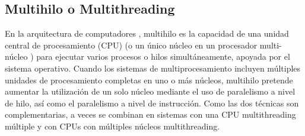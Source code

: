 \documentclass{article}
\begin{document}
\subsection{Multihilo o Multithreading}
En la arquitectura de computadores , multihilo es la capacidad de una unidad central de procesamiento (CPU) (o un único núcleo en un procesador multi-núcleo ) para ejecutar varios procesos o hilos simultáneamente, apoyada por el sistema operativo. Cuando los sistemas de multiprocesamiento incluyen múltiples unidades de procesamiento completas en uno o más núcleos, multihilo pretende aumentar la utilización de un solo núcleo mediante el uso de paralelismo a nivel de hilo\cite{para1}, así como el paralelismo a nivel de instrucción\cite{para2}. Como las dos técnicas son complementarias, a veces se combinan en sistemas con una CPU multithreading múltiple y con CPUs con múltiples núcleos multithreading\cite{multi}.



\end{document}
